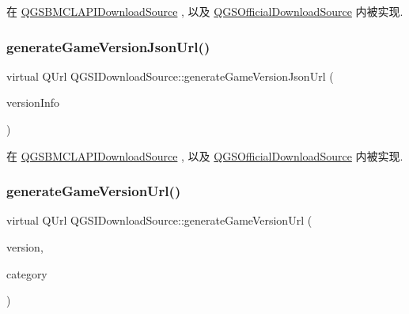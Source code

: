在 \mbox{\hyperlink{class_q_g_s_b_m_c_l_a_p_i_download_source_aaff2a6fa2dff1a694dd4562c0469cae2}{Q\+G\+S\+B\+M\+C\+L\+A\+P\+I\+Download\+Source}} , 以及 \mbox{\hyperlink{class_q_g_s_official_download_source_a8a644e91bf18f28328b9b432620cca00}{Q\+G\+S\+Official\+Download\+Source}} 内被实现.

\mbox{\label{class_q_g_s_i_download_source_acf738f516ec5ce173d8a346dfe65976a}} 
\subsubsection{\texorpdfstring{generate\+Game\+Version\+Json\+Url()}{generateGameVersionJsonUrl()}}
{\footnotesize\ttfamily virtual Q\+Url Q\+G\+S\+I\+Download\+Source\+::generate\+Game\+Version\+Json\+Url (\begin{DoxyParamCaption}\item[{const \mbox{\hyperlink{class_q_g_s_game_version_info}{Q\+G\+S\+Game\+Version\+Info}} \&}]{version\+Info }\end{DoxyParamCaption})\hspace{0.3cm}{\ttfamily [pure virtual]}}



在 \mbox{\hyperlink{class_q_g_s_b_m_c_l_a_p_i_download_source_a3d1636cff4806aba1e630e3fea88daa3}{Q\+G\+S\+B\+M\+C\+L\+A\+P\+I\+Download\+Source}} , 以及 \mbox{\hyperlink{class_q_g_s_official_download_source_a591dd8ed6bbfab644b815c75f7d0710c}{Q\+G\+S\+Official\+Download\+Source}} 内被实现.

\mbox{\label{class_q_g_s_i_download_source_a59b370202b6c3459d70cf6e7f84273e1}} 
\subsubsection{\texorpdfstring{generate\+Game\+Version\+Url()}{generateGameVersionUrl()}}
{\footnotesize\ttfamily virtual Q\+Url Q\+G\+S\+I\+Download\+Source\+::generate\+Game\+Version\+Url (\begin{DoxyParamCaption}\item[{const \mbox{\hyperlink{class_q_g_s_game_version}{Q\+G\+S\+Game\+Version}} \&}]{version,  }\item[{const Q\+String \&}]{category }\end{DoxyParamCaption})\hspace{0.3cm}{\ttfamily [pure virtual]}}



